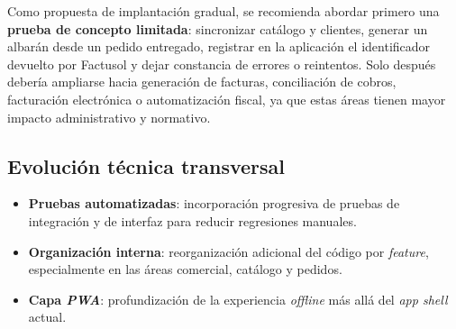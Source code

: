Como propuesta de implantación gradual, se recomienda abordar primero una \textbf{prueba de concepto limitada}: sincronizar catálogo y clientes, generar un albarán desde un pedido entregado, registrar en la aplicación el identificador devuelto por Factusol y dejar constancia de errores o reintentos. Solo después debería ampliarse hacia generación de facturas, conciliación de cobros, facturación electrónica o automatización fiscal, ya que estas áreas tienen mayor impacto administrativo y normativo.

\subsection*{Evolución técnica transversal}
\begin{itemize}
    \item \textbf{Pruebas automatizadas}: incorporación progresiva de pruebas de integración y de interfaz para reducir regresiones manuales.
    \item \textbf{Organización interna}: reorganización adicional del código por \textit{feature}, especialmente en las áreas comercial, catálogo y pedidos.
    \item \textbf{Capa \textit{PWA}}: profundización de la experiencia \textit{offline} más allá del \textit{app shell} actual.
\end{itemize}
